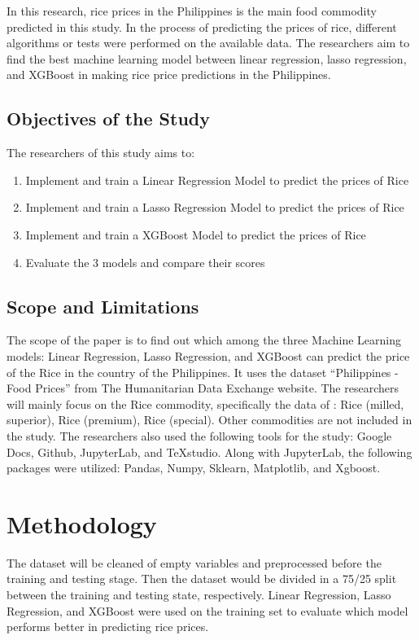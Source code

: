 \documentclass[runningheads]{llncs}
\begin{document}
	In this research, rice prices in the Philippines is the main food commodity predicted in this study. In the process of predicting the prices of rice, different algorithms or tests were performed on the available data. The researchers aim to find the best machine learning model between linear regression, lasso regression, and XGBoost in making rice price predictions in the Philippines.

\subsection{Objectives of the Study}
The researchers of this study aims to:
\begin{enumerate}
	\item Implement and train a Linear Regression Model to predict the prices of Rice
	\item Implement and train a Lasso Regression Model to predict the prices of Rice
	 
	\item Implement and train a XGBoost Model to predict the prices of Rice
	
	\item Evaluate the 3 models and compare their scores
\end{enumerate}

\subsection{Scope and Limitations}
	The scope of the paper is to find out which among the three Machine Learning models: Linear Regression, Lasso Regression, and XGBoost can predict the price of the Rice in the country of the Philippines. It uses the dataset “Philippines - Food Prices” from The Humanitarian Data Exchange website. The researchers will mainly focus on the Rice commodity, specifically the data of : Rice (milled, superior), Rice (premium), Rice (special). Other commodities are not included in the study. The researchers also used the following tools for the study: Google Docs, Github, JupyterLab, and TeXstudio. Along with JupyterLab, the following packages were utilized: Pandas, Numpy, Sklearn, Matplotlib, and Xgboost.


\section{Methodology }
The dataset will be cleaned of empty variables and preprocessed before the training and testing stage. Then the dataset would be divided in a 75/25 split between the training and testing state, respectively. Linear Regression, Lasso Regression, and XGBoost were used on the training set to evaluate which model performs better in predicting rice prices. 
\end{document}
